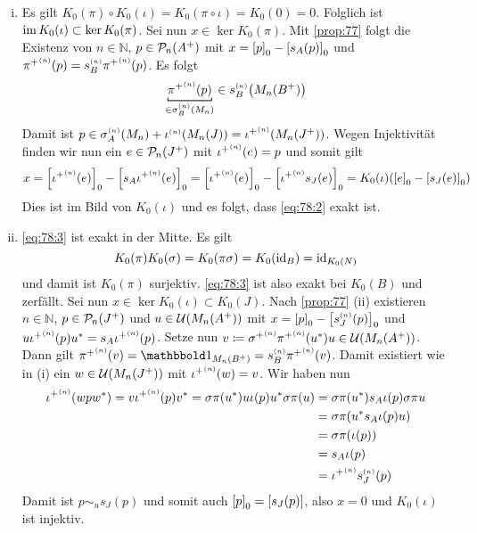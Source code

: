 \begin{beweis}
	\begin{enumerate}[(i)]
		\item Es gilt $K_0(\pi) \circ K_0(\iota) = K_0(\pi \circ \iota) = K_0(0) =0$.
		Folglich ist $\im K_0(\iota) \subset \ker K_0(\pi)$.
		Sei nun $x \in \ker K_0(\pi)$.
		Mit \autoref{prop:77} folgt die Existenz von $n \in \mathbb{N}$, $p \in \kernedP_n(A^+)$ mit $x = \benbrace*{p}_0 - \benbrace*{s_A(p)}_0$ und ${\pi^+}^\ssbrace{n}(p) = s_B^\ssbrace{n} {\pi^+}^\ssbrace{n}(p)$.
		Es folgt
		\[
			\Underbracket{{\pi^+}^\ssbrace{n}(p)}{\in \sigma^\ssbrace{n}_B(M_n)} \in s_B^\ssbrace{n} \enbrace*{M_n(B^+)} 
		\]
		Damit ist $p \in \sigma_A^\ssbrace{n}(M_n) + \iota^\ssbrace{n}(M_n(J)) = {\iota^+}^\ssbrace{n} \enbrace*{M_n(J^+)}$.
		Wegen Injektivität finden wir nun ein $e \in \kernedP_n(J^+)$ mit ${\iota^+}^\ssbrace{n}(e)=p$ und somit gilt 
		\[
			x = \benbrace*{{\iota^+}^\ssbrace{n}(e)}_0 - \benbrace*{s_A {\iota^+}^\ssbrace{n}(e)}_0 = \benbrace*{{\iota^+}^\ssbrace{n}(e)}_0 - \benbrace*{{\iota^+}^\ssbrace{n} s_J(e)}_0 = K_0(\iota) \enbrace*{\benbrace*{e}_0 - \benbrace*{s_J(e)}_0}
		\]
		Dies ist im Bild von $K_0(\iota)$ und es folgt, dass \eqref{eq:78:2} exakt ist.
		\item \eqref{eq:78:3} ist exakt in der Mitte. Es gilt
		\[
			K_0(\pi)K_0(\sigma) = K_0(\pi \sigma) = K_0(\id_B) = {\id_{K_0(N)}}
		\]
		und damit ist $K_0(\pi)$ surjektiv. 
		\eqref{eq:78:3} ist also exakt bei $K_0(B)$ und zerfällt.
		Sei nun $x \in \ker K_0(\iota) \subset K_0(J)$.
		Nach \autoref{prop:77} (ii) existieren $n \in \mathbb{N}$, $p \in \kernedP_n(J^+)$ und $u \in \mathcal{U} \enbrace*{M_n(A^+)}$ mit $x = \benbrace*{p}_0 - \benbrace*{s_J^\ssbrace{n}(p)}_0$ und $u{\iota^+}^\ssbrace{n}(p) u^* = s_A{\iota^+}^\ssbrace{n}(p)$.
		Setze nun $v \coloneqq {\sigma^+}^\ssbrace{n} {\pi^+}^\ssbrace{n}(u^*)u \in \mathcal{U} \enbrace*{M_n(A^+)}$.
		Dann gilt ${\pi^+}^\ssbrace{n}(v) = \ind_{M_n(B^+)} = s_B^\ssbrace{n} {\pi^+}^\ssbrace{n}(v)$.
		Damit existiert wie in (i) ein $w \in \mathcal{U} \enbrace*{M_n(J^+)}$ mit ${\iota^+}^\ssbrace{n}(w)=v$.
		Wir haben nun
		\begin{align}
			{\iota^+}^\ssbrace{n} (w pw^*) = v {\iota^+}^\ssbrace{n}(p) v^* = \sigma\pi(u^*) u \iota(p) u^* \sigma \pi(u) &= \sigma \pi (u^*) s_A\iota(p) \sigma \pi u \\
			&= \sigma \pi \enbrace*{u^* s_A \iota(p) u} \\
			&= \sigma \pi\enbrace*{\iota(p)} \\
			&= s_A \iota(p) \\
			&= {\iota^+}^\ssbrace{n} s_J^\ssbrace{n} (p)
		\end{align}
		Damit ist $p \sim_u s_J(p)$ und somit auch $\benbrace*{p}_0 = \benbrace*{s_J(p)} $, also $x=0$ und $K_0(\iota)$ ist injektiv.\qedhere
	\end{enumerate}
\end{beweis}

